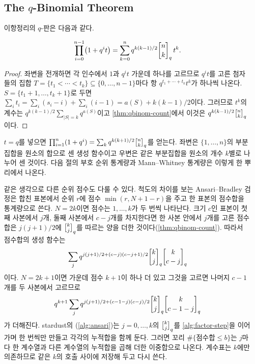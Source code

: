 \subsection{The $q$-Binomial Theorem}

이항정리의 $q$-판은 다음과 같다.

\begin{theorem}[$q$-이항정리]
\label{thm:qbinomial-theorem}
\[
\prod_{i=0}^{n-1}\bigl(1+q^it\bigr)=\sum_{k=0}^nq^{k(k-1)/2}\qbinom nk\,t^k.
\]
\end{theorem}

\begin{proof}
좌변을 전개하면 각 인수에서 $1$과 $q^it$ 가운데 하나를 고르므로 $q^it$를 고른 첨자들의 집합 $T=\{t_1<\cdots<t_k\}\subseteq\{0,\dots,n-1\}$마다 항 $q^{t_1+\cdots+t_k}t^k$가 하나씩 나온다. $S=\{t_1+1,\dots,t_k+1\}$로 두면 $\sum_it_i=\sum_i(s_i-i)+\sum_i(i-1)=a(S)+k(k-1)/2$이다. 그러므로 $t^k$의 계수는 $q^{k(k-1)/2}\sum_{|S|=k}q^{a(S)}$이고 \cref{thm:qbinom-count}에서 이것은 $q^{k(k-1)/2}\qbinom nk$이다.
\end{proof}

$t=q$를 넣으면 $\prod_{i=1}^n(1+q^i)=\sum_kq^{k(k+1)/2}\qbinom nk$를 얻는다. 좌변은 $\{1,\dots,n\}$의 부분집합을 원소의 합으로 센 생성 함수이고 우변은 같은 부분집합을 원소의 개수 $k$별로 나누어 센 것이다. 다음 절의 부호 순위 통계량과 Mann--Whitney 통계량은 이렇게 한 뿌리에서 나온다.

같은 생각으로 다른 순위 점수도 다룰 수 있다. 척도의 차이를 보는 Ansari--Bradley 검정\cite{ansari1960}은 합친 표본에서 순위 $r$에 점수 $\min(r,N+1-r)$을 주고 한 표본의 점수합을 통계량으로 쓴다. $N=2k$이면 점수는 $1,\dots,k$가 두 번씩 나타난다. 크기 $c$인 표본이 첫째 사본에서 $j$개, 둘째 사본에서 $c-j$개를 차지한다면 한 사본 안에서 $j$개를 고른 점수합은 $j(j+1)/2$에 $\qbinom kj$를 따르는 양을 더한 것이다(\cref{thm:qbinom-count}). 따라서 점수합의 생성 함수는
\[
\sum_jq^{j(j+1)/2+(c-j)(c-j+1)/2}\qbinom kj\qbinom k{c-j}
\]
이다. $N=2k+1$이면 가운데 점수 $k+1$이 하나 더 있고 그것을 고르면 나머지 $c-1$개를 두 사본에서 고르므로
\[
q^{k+1}\sum_jq^{j(j+1)/2+(c-1-j)(c-j)/2}\qbinom kj\qbinom k{c-1-j}
\]
가 더해진다. stardust의 (\cref{alg:ansari})는 $j=0,\dots,k$의 $\qbinom kj$를 \cref{alg:factor-step}을 이어 가며 한 번씩만 만들고 각각의 누적합을 함께 둔다. 그러면 꼬리 $\#\{\text{점수합}\le b\}$는 $j$마다 한 계수열과 다른 계수열의 누적합을 곱해 더한 이중합으로 나온다. 계수표는 $k$에만 의존하므로 같은 $k$의 호출 사이에 저장해 두고 다시 쓴다.


